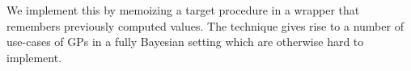 \begin{comment}
{\tt gpmem} is an extension of previous approaches to stochastic memoization. Previous approaches such as the one introduced for Dirichlet Processes in the Church language~\citep{goodman2008church} deal with the discrete-valued domain. We introduce memoization for the continuous valued domain. This is important for problems of regression and optimization where target functions should not be artificially discretized. We present a probabilistic programming technique that uses a GP to provide a statistical variant of memoization. 
\end{comment}


We implement this by memoizing a target procedure in a wrapper that remembers previously computed values. The technique gives rise to a number of use-cases of GPs in a fully Bayesian setting which are otherwise hard to implement.